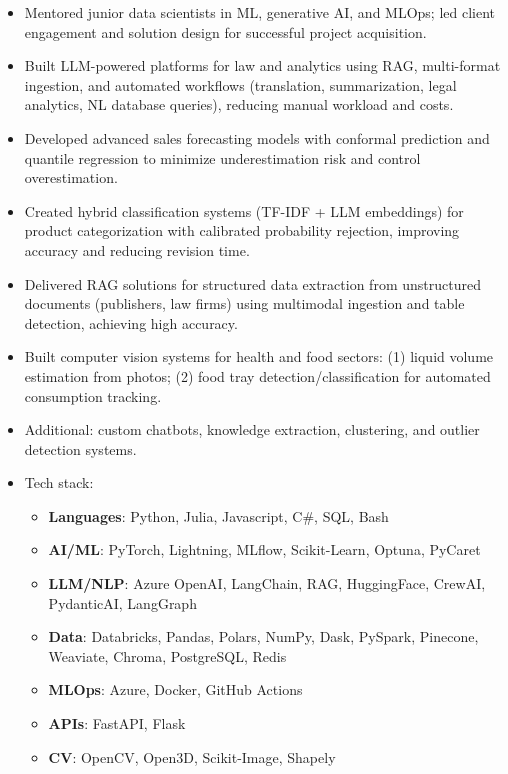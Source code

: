 
{\small
  \begin{itemize}
    \item Mentored junior data scientists in ML, generative AI, and MLOps; led client engagement and solution design for successful project acquisition.
    \item Built LLM-powered platforms for law and analytics using RAG, multi-format ingestion, and automated workflows (translation, summarization, legal analytics, NL database queries), reducing manual workload and costs.
    \item Developed advanced sales forecasting models with conformal prediction and quantile regression to minimize underestimation risk and control overestimation.
    \item Created hybrid classification systems (TF-IDF + LLM embeddings) for product categorization with calibrated probability rejection, improving accuracy and reducing revision time.
    \item Delivered RAG solutions for structured data extraction from unstructured documents (publishers, law firms) using multimodal ingestion and table detection, achieving high accuracy.
    \item Built computer vision systems for health and food sectors: (1) liquid volume estimation from photos; (2) food tray detection/classification for automated consumption tracking.
    \item Additional: custom chatbots, knowledge extraction, clustering, and outlier detection systems.
    \item Tech stack:
      \begin{itemize}
        \item \textbf{Languages}: {\color{accent2}Python, Julia, Javascript, C\#, SQL, Bash}
        \item \textbf{AI/ML}: {\color{accent2}PyTorch, Lightning, MLflow, Scikit-Learn, Optuna, PyCaret}
        \item \textbf{LLM/NLP}: {\color{accent2}Azure OpenAI, LangChain, RAG, HuggingFace, CrewAI, PydanticAI, LangGraph}
        \item \textbf{Data}: {\color{accent2}Databricks, Pandas, Polars, NumPy, Dask, PySpark, Pinecone, Weaviate, Chroma, PostgreSQL, Redis}
        \item \textbf{MLOps}: {\color{accent2}Azure, Docker, GitHub Actions}
        \item \textbf{APIs}: {\color{accent2}FastAPI, Flask}
        \item \textbf{CV}: {\color{accent2}OpenCV, Open3D, Scikit-Image, Shapely}
      \end{itemize}
  \end{itemize}

}
